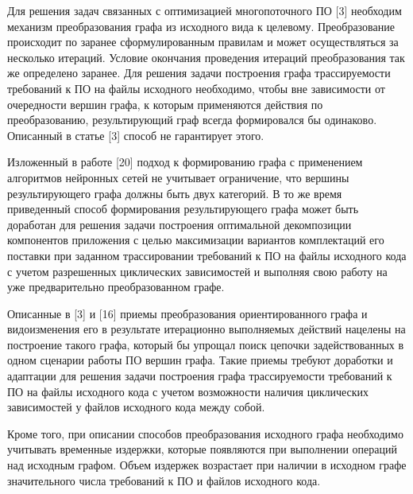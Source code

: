 Для решения задач связанных с оптимизацией многопоточного ПО [3] необходим механизм преобразования графа из исходного вида к целевому. Преобразование происходит по заранее сформулированным правилам и может осуществляться за несколько итераций. Условие окончания проведения итераций преобразования так же определено заранее. Для решения задачи построения графа трассируемости требований к ПО на файлы исходного необходимо, чтобы вне зависимости от очередности вершин графа, к которым применяются действия по преобразованию, результирующий граф всегда формировался бы одинаково. Описанный в статье [3] способ не гарантирует этого. 

Изложенный в работе [20] подход к формированию графа с применением алгоритмов нейронных сетей не учитывает ограничение, что вершины результирующего графа должны быть двух категорий. В то же время приведенный способ формирования результирующего графа может быть доработан для решения задачи построения оптимальной декомпозиции компонентов приложения с целью максимизации вариантов комплектаций его поставки при заданном трассировании требований к ПО на файлы исходного кода с учетом разрешенных циклических зависимостей и выполняя свою работу на уже предварительно преобразованном графе.

Описанные в [3] и [16] приемы преобразования ориентированного графа и видоизменения его в результате итерационно выполняемых действий нацелены на построение такого графа, который бы упрощал поиск цепочки задействованных в одном сценарии работы ПО вершин графа. Такие приемы требуют доработки и адаптации для решения задачи построения графа трассируемости требований к ПО на файлы исходного кода с учетом возможности наличия циклических зависимостей у файлов исходного кода между собой.

Кроме того, при описании способов преобразования исходного графа необходимо учитывать временные издержки, которые появляются при выполнении операций над исходным графом. Объем издержек возрастает при наличии в исходном графе значительного числа требований к ПО и файлов исходного кода.
